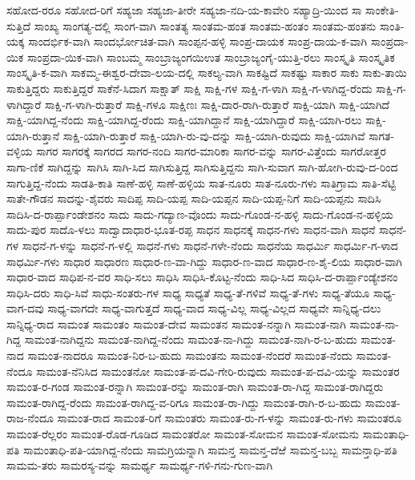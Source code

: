 ಸಹೋದ-ರರೂ
ಸಹೋದ-ರಿಗೆ
ಸಹ್ಯಜಾ
ಸಹ್ಯಜಾ-ತೀರೇ
ಸಹ್ಯಜಾ-ನದಿ-ಯ-ಕಾವೇರಿ
ಸಹ್ಯಾದ್ರಿ-ಯಿಂದ
ಸಾ
ಸಾಂಕೇತಿ-ಸುತ್ತಿದೆ
ಸಾಂಖ್ಯ
ಸಾಂಗತ್ಯ-ದಲ್ಲಿ
ಸಾಂಗ-ವಾಗಿ
ಸಾಂತತ್ಯ
ಸಾಂತಮ-ಹಂತ
ಸಾಂತಮ-ಹಂತಂ
ಸಾಂತಮ-ಹಂತನು
ಸಾಂತಿ-ಯಕ್ಕ
ಸಾಂದರ್ಭಿಕ-ವಾಗಿ
ಸಾಂದರ್ಭೋಚಿತ-ವಾಗಿ
ಸಾಂಪ್ಪನ-ಹಳ್ಳಿ
ಸಾಂಪ್ರ-ದಾಯಕ
ಸಾಂಪ್ರ-ದಾಯ-ಕ-ವಾಗಿ
ಸಾಂಪ್ರದಾ-ಯಿಕ
ಸಾಂಪ್ರದಾ-ಯಿಕ-ವಾಗಿ
ಸಾಂಬಮ್ಮ
ಸಾಂಬ್ರಾಜ್ಯಂಗಯಿಉತ
ಸಾಂಬ್ರಾಜ್ಯಂಗೈ-ಯುತ್ತಿ-ರಲು
ಸಾಂಸ್ಕೃತಿ
ಸಾಂಸ್ಕೃತಿಕ
ಸಾಂಸ್ಕೃತಿ-ಕ-ವಾಗಿ
ಸಾಕಮ್ಮ-ಈಶ್ವರ-ದೇವಾ-ಲಯ-ದಲ್ಲಿ
ಸಾಕಲ್ಯ-ವಾಗಿ
ಸಾಕಷ್ಟಿದೆ
ಸಾಕಷ್ಟು
ಸಾಕಾರ
ಸಾಕು
ಸಾಕು-ತಾಯಿ
ಸಾಕುತ್ತಿದ್ದರು
ಸಾಕುತ್ತಿದ್ದರೆ
ಸಾಕೆನೆ-ಸಿದಾಗ
ಸಾಕ್ಷಾತ್
ಸಾಕ್ಷಿ
ಸಾಕ್ಷಿ-ಗಳ
ಸಾಕ್ಷಿ-ಗ-ಳಾಗಿ
ಸಾಕ್ಷಿ-ಗ-ಳಾಗಿದ್ದ-ರೆಂದು
ಸಾಕ್ಷಿ-ಗ-ಳಾಗಿದ್ದಾರೆ
ಸಾಕ್ಷಿ-ಗ-ಳಾಗಿ-ರುತ್ತಾರೆ
ಸಾಕ್ಷಿ-ಗಳೂ
ಸಾಕ್ಷಿಣಃ
ಸಾಕ್ಷಿ-ದಾರ-ರಾಗಿ-ರುತ್ತಾರೆ
ಸಾಕ್ಷಿ-ಯಾಗಿ
ಸಾಕ್ಷಿ-ಯಾಗಿದೆ
ಸಾಕ್ಷಿ-ಯಾಗಿದ್ದ-ನೆಂದು
ಸಾಕ್ಷಿ-ಯಾಗಿದ್ದ-ರೆಂದು
ಸಾಕ್ಷಿ-ಯಾಗಿದ್ದಾನೆ
ಸಾಕ್ಷಿ-ಯಾಗಿದ್ದಾರೆ
ಸಾಕ್ಷಿ-ಯಾಗಿ-ರಲು
ಸಾಕ್ಷಿ-ಯಾಗಿ-ರುತ್ತಾನೆ
ಸಾಕ್ಷಿ-ಯಾಗಿ-ರುತ್ತಾರೆ
ಸಾಕ್ಷಿ-ಯಾಗಿ-ರು-ವು-ದನ್ನು
ಸಾಕ್ಷಿ-ಯಾಗಿ-ರುವುದು
ಸಾಕ್ಷಿ-ಯಾಗಿವೆ
ಸಾಗತ-ವಳ್ಳಿಯ
ಸಾಗರ
ಸಾಗರಕ್ಕೆ
ಸಾಗರದ
ಸಾಗರ-ನಂದಿ
ಸಾಗರ-ಮಾರಿಕಾ
ಸಾಗರ-ವನ್ನು
ಸಾಗರ-ವಿತ್ತೆಂದು
ಸಾಗರೋತ್ತರ
ಸಾಗಾ-ಣಿಕೆ
ಸಾಗಿದ್ದನ್ನು
ಸಾಗಿಸಿ
ಸಾಗಿ-ಸಿದ
ಸಾಗಿಸುತ್ತಿದ್ದ
ಸಾಗಿಸುತ್ತಿದ್ದನು
ಸಾಗಿ-ಸುವಾಗ
ಸಾಗಿ-ಹೋಗಿ-ರುವು-ದ-ರಿಂದ
ಸಾಗುತ್ತಿದ್ದ-ನೆಂದು
ಸಾಡತಿ-ಕಾತಿ
ಸಾಣೆ-ಹಳ್ಳಿ
ಸಾಣೆ-ಹಳ್ಳಿಯ
ಸಾತ-ನೂರು
ಸಾತ-ನೂರು-ಗಳು
ಸಾತಿಗ್ರಾಮ
ಸಾತಿ-ಸೆಟ್ಟಿ
ಸಾತೇ-ಗೌಡನ
ಸಾದನ್ನು-ಶೈವರು
ಸಾದಿಪ್ಪ
ಸಾದಿ-ಯಪ್ಪ
ಸಾದಿ-ಯಪ್ಪನ
ಸಾದಿ-ಯಪ್ಪ-ನಿಗೆ
ಸಾದಿ-ಯಪ್ಪನು
ಸಾದಿಸಿ
ಸಾದಿಸಿ-ದ-ರಾರ್ಪ್ಪಾಂಡೇಶನಂ
ಸಾದು
ಸಾದು-ಗದ್ಯಾಣ-ವೊಂದು
ಸಾದು-ಗೊಂಡ-ನ-ಹಳ್ಳಿ
ಸಾದು-ಗೊಂಡ-ನ-ಹಳ್ಳಿಯ
ಸಾದು-ಪುರ
ಸಾದೊ-ಳಲು
ಸಾದ್ವಾದಾಧಾರ-ಭೂತ-ರಪ್ಪ
ಸಾಧನ
ಸಾಧನಕ್ಕೆ
ಸಾಧನ-ಗಳು
ಸಾಧನ-ವಾಗಿ
ಸಾಧನೆ
ಸಾಧನೆ-ಗಳ
ಸಾಧನೆ-ಗ-ಳನ್ನು
ಸಾಧನೆ-ಗ-ಳಲ್ಲಿ
ಸಾಧನೆ-ಗಳು
ಸಾಧನೆ-ಗಳೇ-ನೆಂದು
ಸಾಧನೆಯ
ಸಾಧರ್ಮಿ
ಸಾಧರ್ಮಿ-ಗ-ಳಾದ
ಸಾಧರ್ಮಿ-ಗಳು
ಸಾಧಾರ
ಸಾಧಾರಣ
ಸಾಧಾರ-ಣ-ವಾ-ಗಿದ್ದು
ಸಾಧಾರ-ಣ-ವಾದ
ಸಾಧಾರ-ಣ-ಶೈ-ಲಿಯ
ಸಾಧಾರ-ವಾಗಿ
ಸಾಧಾರ-ವಾದ
ಸಾಧಿಪ-ನ-ವರ
ಸಾಧಿ-ಸಲು
ಸಾಧಿಸಿ
ಸಾಧಿಸಿ-ಕೊಟ್ಟ-ನೆಂದು
ಸಾಧಿ-ಸಿದ
ಸಾಧಿಸಿ-ದ-ರಾರ್ಪ್ಪಾಂಡ್ಯೇಶನಂ
ಸಾಧಿಸಿ-ದರು
ಸಾಧಿ-ಸಿವೆ
ಸಾಧು-ಸಂತರು-ಗಳ
ಸಾಧ್ಯ
ಸಾಧ್ಯತೆ
ಸಾಧ್ಯ-ತೆ-ಗಳಿವೆ
ಸಾಧ್ಯ-ತೆ-ಗಳು
ಸಾಧ್ಯ-ತೆಯೂ
ಸಾಧ್ಯ-ವಾಗ-ದವು
ಸಾಧ್ಯ-ವಾಗದೇ
ಸಾಧ್ಯ-ವಾಗುತ್ತದೆ
ಸಾಧ್ಯ-ವಾದ
ಸಾಧ್ಯ-ವಿಲ್ಲ
ಸಾಧ್ಯ-ವಿಲ್ಲದ
ಸಾಧ್ಯವೇ
ಸಾನ್ನಿಧ್ಯ-ದಲು
ಸಾನ್ನಿಧ್ಯ-ರಾದ
ಸಾಮಂತ
ಸಾಮಂತಂ
ಸಾಮಂತ-ದೇವ
ಸಾಮಂತನ
ಸಾಮಂತ-ನನ್ನಾಗಿ
ಸಾಮಂತ-ನಾಗಿ
ಸಾಮಂತ-ನಾ-ಗಿದ್ದ
ಸಾಮಂತ-ನಾಗಿದ್ದನು
ಸಾಮಂತ-ನಾಗಿದ್ದ-ನೆಂದು
ಸಾಮಂತ-ನಾ-ಗಿದ್ದು
ಸಾಮಂತ-ನಾಗಿ-ರ-ಬ-ಹುದು
ಸಾಮಂತ-ನಾದ
ಸಾಮಂತ-ನಾದರೂ
ಸಾಮಂತ-ನಿರ-ಬ-ಹುದು
ಸಾಮಂತನು
ಸಾಮಂತ-ನೆಂದರೆ
ಸಾಮಂತ-ನೆಂದು
ಸಾಮಂತ-ನೆಂದೂ
ಸಾಮಂತ-ನೆನಿಸಿದ
ಸಾಮಂತನೋ
ಸಾಮಂತ-ಪ-ದವಿ-ಗೇರಿ-ರುವುದು
ಸಾಮಂತ-ಪ-ದವಿ-ಯನ್ನು
ಸಾಮಂತರ
ಸಾಮಂತ-ರ-ಗಂಡ
ಸಾಮಂತ-ರನ್ನಾಗಿ
ಸಾಮಂತ-ರನ್ನು
ಸಾಮಂತ-ರಾಗಿ
ಸಾಮಂತ-ರಾ-ಗಿದ್ದ
ಸಾಮಂತ-ರಾಗಿದ್ದರು
ಸಾಮಂತ-ರಾಗಿದ್ದ-ರೆಂದು
ಸಾಮಂತ-ರಾಗಿದ್ದ-ವ-ರಿಗೂ
ಸಾಮಂತ-ರಾ-ಗಿದ್ದು
ಸಾಮಂತ-ರಾಗಿ-ರ-ಬ-ಹುದು
ಸಾಮಂತ-ರಾಜ-ನೆಂದೂ
ಸಾಮಂತ-ರಾದ
ಸಾಮಂತ-ರಿಗೆ
ಸಾಮಂತರು
ಸಾಮಂತ-ರು-ಗ-ಳನ್ನು
ಸಾಮಂತ-ರು-ಗಳು
ಸಾಮಂತರೂ
ಸಾಮಂತ-ರೆಲ್ಲರಂ
ಸಾಮಂತ-ರೊಡ-ಗೂಡಿದ
ಸಾಮಂತರೋ
ಸಾಮಂತ-ಸೋಮನ
ಸಾಮಂತ-ಸೋಮನು
ಸಾಮಂತಾಧಿ-ಪತಿ
ಸಾಮಂತಾಧಿ-ಪತಿ-ಯಾಗಿದ್ದ-ನೆಂದು
ಸಾಮಗ್ರಿಯನ್ನಾಗಿ
ಸಾಮನ್ತ
ಸಾಮನ್ತ-ದೆಱೆ
ಸಾಮನ್ತ-ಬಬ್ಬ
ಸಾಮನ್ತಾಧಿ-ಪತಿ
ಸಾಮಮ-ತರು
ಸಾಮರಸ್ಯ-ವನ್ನು
ಸಾಮರ್ಥ್ಯ
ಸಾಮರ್ಥ್ಯ-ಗಳಿ-ಗನು-ಗುಣ-ವಾಗಿ
